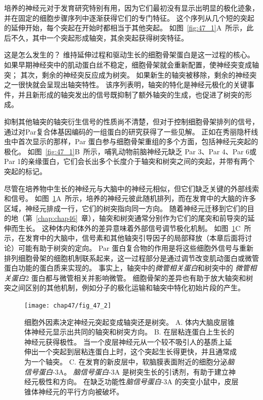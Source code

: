 培养的神经元对于发育研究特别有用，因为它们最初没有显示出明显的极化迹象，并在固定的细胞步骤序列中逐渐获得它们的专门特征。
这个序列从几个短的突起的延伸开始，每个突起在开始时都相当于其他突起。
如图~\ref{fig:47_1}A~所示，此后不久，其中一个突起形成轴突，其余突起获得树突特征。


这是怎么发生的？
维持延伸过程和驱动生长的细胞骨架蛋白是这一过程的核心。
如果早期神经突中的肌动蛋白丝不稳定，细胞骨架就会重新配置，使神经突变成轴突；
其次，剩余的神经突反应成为树突。
如果新生的轴突被移除，剩余的神经突之一很快就会呈现出轴突特性。
该序列表明，轴突的特化是神经元极化的关键事件，并且新形成的轴突发出的信号既抑制了额外轴突的生成，也促进了树突的形成。


抑制其他轴突的轴突衍生信号的性质尚不清楚，但对于控制细胞骨架排列的信号，通过对Par复合体基因编码的一组蛋白的研究获得了一些见解。
正如在秀丽隐杆线虫中首次显示的那样，Par 蛋白参与细胞骨架重组的多个方面，包括神经元突起的极化。
如图~\ref{fig:47_1}B~所示，哺乳动物前脑神经元缺乏 Par 3、Par 4、Par 6或Par 1的亲缘蛋白，它们会长出多个长度介于轴突和树突之间的突起，并带有两个突起的标记。


尽管在培养物中生长的神经元与大脑中的神经元相似，但它们缺乏关键的外部线索和信号。
如图~\ref{fig:47_2}A~所示，培养的神经元彼此随机排列，而在发育中的大脑的许多区域，神经元排成一行，它们的树突指向同一方向。
随着神经元迁移到它们的目的地（第~\ref{chap:chap46}~章），轴突和树突通常分别作为它们的尾突和前导突的延伸而生长。
这种体内和体外的差异意味着外部信号调节极化机制。
如图~\ref{fig:47_2}C~所示，在发育中的大脑中，信号素和其他轴突引导因子的局部释放（本章后面将讨论）可能有助于树突的定向。
Par 蛋白复合物的作用是将这些细胞外信号与重新排列细胞骨架的细胞机制联系起来，这一过程部分是通过调节改变肌动蛋白或微管蛋白功能的蛋白质来实现的。
事实上，轴突中的\textit{微管相关蛋白}和树突中的 \textit{微管相关蛋白}2 蛋白都与微管相关并影响微管。
细胞骨架的差异也有助于放大轴突和树突之间区别的其他机制，例如分子的极化运输和轴突中特化初始片段的产生。


\begin{figure}[htbp]
	\centering
	\texttt{[image: chap47/fig\_47\_2]}
	\caption{细胞外因素决定神经元突起变成轴突还是树突。
		A. 体内大脑皮层锥体神经元显示出共同的轴突和树突方向。
		B. 在层粘连蛋白上生长的神经元获得极性。
		当一个皮层神经元从一个较不吸引人的基质上延伸出一个突起到层粘连蛋白上时，这个突起生长得更快，并且通常成为一个轴突。
		C. 在发育的新皮层中，软脑膜表面附近的细胞分泌\textit{脑信号蛋白}-3A。
		\textit{脑信号蛋白}-3A 是树突生长的引诱剂，有助于建立神经元极性和方向。
		在缺乏功能性\textit{脑信号蛋白}-3A 的突变小鼠中，皮层锥体神经元的平行方向被破坏。}
	\label{fig:47_2}
\end{figure}


